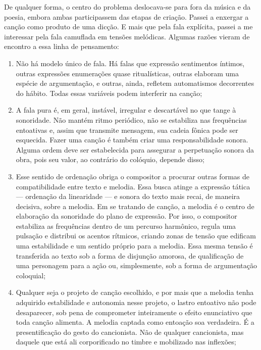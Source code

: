 De qualquer forma, o centro do problema deslocava-se para fora da música e
da poesia, embora ambas participassem das etapas de criação. Passei a
enxergar a canção como produto de uma dicção. E mais que pela fala
explícita, passei a me interessar pela fala camuflada em tensões
melódicas. Algumas razões vieram de encontro a essa linha de pensamento:

\begin{enumerate}%
\item Não há modelo único de fala. Há falas que expressão sentimentos
íntimos, outras expressões enumerações quase ritualísticas, outras
elaboram uma espécie de argumentação, e outras, ainda, refletem
automatismos decorrentes do hábito. Todas essas variáveis podem
interferir na canção;

\item A fala pura é, em geral, instável, irregular e descartável no que
tange à sonoridade. Não mantém ritmo periódico, não se estabiliza nas
frequências entoativas e, assim que transmite mensagem, sua cadeia
fônica pode ser esquecida. Fazer uma canção é também criar uma
responsabilidade sonora. Alguma ordem deve ser estabelecida para
assegurar a perpetuação sonora da obra, pois seu valor, ao contrário do
colóquio, depende disso;

\item Esse sentido de ordenação obriga o compositor a procurar outras
formas de compatibilidade entre texto e melodia. Essa busca atinge a
expressão tática --- ordenação da linearidade --- e sonora do texto mais
recai, de maneira decisiva, sobre a melodia. Em se tratando de canção, a
melodia é o centro de elaboração da sonoridade do plano de expressão.
Por isso, o compositor estabiliza as frequências dentro de um percurso
harmônico, regula uma pulsação e distribui os acentos rítmicos, criando
zonas de tensão que edificam uma estabilidade e um sentido próprio para
a melodia. Essa mesma tensão é transferida ao texto sob a forma de
disjunção amorosa, de qualificação de uma personagem para a ação ou,
simplesmente, sob a forma de argumentação coloquial;

\item Qualquer seja o projeto de canção escolhido, e por mais que a melodia
tenha adquirido estabilidade e autonomia nesse projeto, o lastro
entoativo não pode desaparecer, sob pena de comprometer inteiramente o
efeito enunciativo que toda canção alimenta. A melodia captada como
entoação soa verdadeira. É a presentificação do gesto do cancionista.
Não de qualquer cancionista, mas daquele que está ali corporificado no
timbre e mobilizado nas inflexões;


\end{enumerate}
